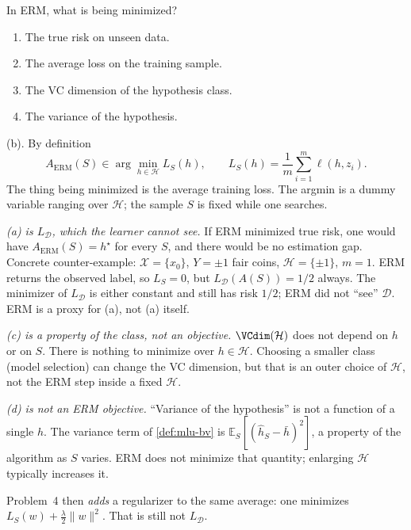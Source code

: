\begin{exercise}
\label{ex:mlu-erm-mcq}
In ERM, what is being minimized?
\begin{enumerate}[label=(\alph*)]
    \item The true risk on unseen data.
    \item The average loss on the training sample.
    \item The VC dimension of the hypothesis class.
    \item The variance of the hypothesis.
\end{enumerate}
\end{exercise}

\begin{solution}
(b). By definition
\[
A_{\mathrm{ERM}}(S)\in\arg\min_{h\in\mathcal{H}}L_S(h),
\qquad
L_S(h)=\frac1m\sum_{i=1}^m\ell(h,z_i).
\]
The thing being minimized is the average training loss. The argmin is a dummy variable ranging over $\mathcal{H}$; the sample $S$ is fixed while one searches.

\textit{(a) is $L_{\mathcal{D}}$, which the learner cannot see.}
If ERM minimized true risk, one would have $A_{\mathrm{ERM}}(S)=h^\star$ for every $S$, and there would be no estimation gap. Concrete counter-example: $\mathcal{X}=\{x_0\}$, $Y=\pm 1$ fair coins, $\mathcal{H}=\{\pm 1\}$, $m=1$. ERM returns the observed label, so $L_S=0$, but $L_{\mathcal{D}}(A(S))=1/2$ always. The minimizer of $L_{\mathcal{D}}$ is either constant and still has risk $1/2$; ERM did not ``see'' $\mathcal{D}$. ERM is a proxy for (a), not (a) itself.

\textit{(c) is a property of the class, not an objective.}
$\VCdim(\mathcal{H})$ does not depend on $h$ or on $S$. There is nothing to minimize over $h\in\mathcal{H}$. Choosing a smaller class (model selection) can change the VC dimension, but that is an outer choice of $\mathcal{H}$, not the ERM step inside a fixed $\mathcal{H}$.

\textit{(d) is not an ERM objective.}
``Variance of the hypothesis'' is not a function of a single $h$. The variance term of \cref{def:mlu-bv} is $\mathbb{E}_S[(\widehat h_S-\bar h)^2]$, a property of the algorithm as $S$ varies. ERM does not minimize that quantity; enlarging $\mathcal{H}$ typically increases it.

Problem~4 then \emph{adds} a regularizer to the same average: one minimizes $L_S(w)+\tfrac{\lambda}{2}\lVert w\rVert^2$. That is still not $L_{\mathcal{D}}$.
\end{solution}

